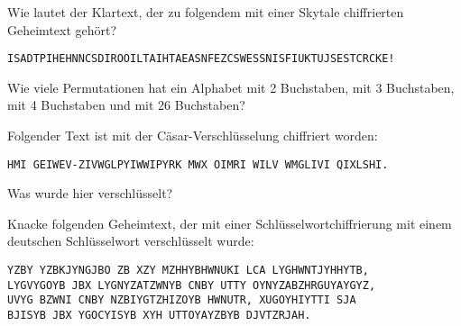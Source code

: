 \documentclass{zusammenfassung}
\begin{document}

\begin{aufgabe}
  Wie lautet der Klartext, der zu folgendem mit einer Skytale chiffrierten Geheimtext gehört?

  \texttt{ISADTPIHEHNNCSDIROOILTAIHTAEASNFEZCSWESSNISFIUKTUJSESTCRCKE!}
\end{aufgabe}

\begin{aufgabe}
  Wie viele Permutationen hat ein Alphabet mit 2 Buchstaben, mit 3 Buchstaben, mit 4 Buchstaben und mit 26 Buchstaben?
\end{aufgabe}

\begin{aufgabe}
  Folgender Text ist mit der Cäsar-Verschlüsselung chiffriert worden:

  \texttt{HMI GEIWEV-ZIVWGLPYIWWIPYRK MWX OIMRI WILV WMGLIVI QIXLSHI.}

  Was wurde hier verschlüsselt?
\end{aufgabe}

\begin{aufgabe}
  Knacke folgenden Geheimtext, der mit einer Schlüsselwortchiffrierung mit einem deutschen Schlüsselwort verschlüsselt wurde:

  \texttt{YZBY YZBKJYNGJBO ZB XZY MZHHYBHWNUKI LCA LYGHWNTJYHHYTB, \\LYGVYGOYB JBX LYGNYZATZWNYB CNBY UTTY
  OYNYZABZHRGUYAYGYZ, \\UVYG BZWNI CNBY NZBIYGTZHIZOYB HWNUTR, XUGOYHIYTTI SJA \\BJISYB JBX YGOCYISYB XYH UTTOYAYZBYB DJVTZRJAH.}
\end{aufgabe}
\end{document}
